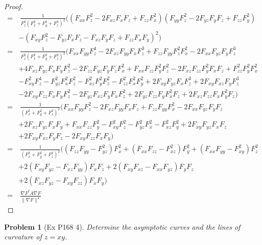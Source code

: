 \documentclass[10pt,a4paper]{article}
\newcounter{theProblemCounter}
\newtheorem{problem}[theProblemCounter]{Problem}
\begin{document}
\begin{proof}
\begin{align*}
=&\ \frac{1}{F_z^2(F_x^2+F_y^2+F_z^2)^2}(\left(F_{xx}F_z^2-2F_{xz}F_xF_z+F_{zz}F_x^2\right)\left(F_{yy}F_z^2-2F_{yz}F_yF_z+F_{zz}F_y^2\right)\\
&-\left(F_{xy}F_z^2-F_{yz}F_xF_z-F_{xz}F_yF_z+F_{zz}F_xF_y\right)^2)\\
=&\ \frac{1}{F_z^2(F_x^2+F_y^2+F_z^2)^2}(
F_{xx}F_{yy}F_z^4-2F_{xz}F_{yy}F_xF_z^3+F_{zz}F_{yy}F_z^2F_x^2-2F_{xx}F_{yz}F_yF_z^3\\
&+4F_{xz}F_{yz}F_xF_yF_z^2-2F_{zz}F_{yz}F_yF_zF_x^2+F_{xx}F_{zz}F_y^2F_z^2-2F_{xz}F_{zz}F_y^2F_xF_z+F_{zz}^2F_y^2F_x^2\\
&-F_{xy}^2F_z^4-F_{yz}^2F_x^2F_z^2-F_{xz}^2F_y^2F_z^2-F_{zz}^2F_x^2F_y^2+2F_{xy}F_{yz}F_xF_z^3+2F_{xy}F_{xz}F_yF_z^3\\
&-2F_{xy}F_{zz}F_xF_yF_z^2-2F_{yz}F_{xz}F_yF_xF_z^2+2F_{yz}F_{zz}F_yF_x^2F_z+2F_{xz}F_{zz}F_xF_y^2F_z)\\
=&\ \frac{1}{(F_x^2+F_y^2+F_z^2)^2}(
F_{xx}F_{yy}F_z^2-2F_{xz}F_{yy}F_xF_z+F_{zz}F_{yy}F_x^2-2F_{xx}F_{yz}F_yF_z\\
&+2F_{xz}F_{yz}F_xF_y+F_{xx}F_{zz}F_y^2-F_{xy}^2F_z^2-F_{yz}^2F_x^2-F_{xz}^2F_y^2+2F_{xy}F_{yz}F_xF_z\\
&+2F_{xy}F_{xz}F_yF_z-2F_{xy}F_{zz}F_xF_y)\\
=&\ \frac{1}{(F_x^2+F_y^2+F_z^2)^2}(
(F_{zz}F_{yy}-F_{yz}^2)F_x^2+(F_{xx}F_{zz}-F_{xz}^2)F_y^2+(F_{xx}F_{yy}-F_{xy}^2)F_z^2\\
&+2(F_{xy}F_{yz}-F_{xz}F_{yy})F_xF_z+2(F_{xy}F_{xz}-F_{xx}F_{yz})F_yF_z\\
&+2(F_{xz}F_{yz}-F_{xy}F_{zz})F_xF_y)\\
=&\ \frac{\nabla F^t A\nabla F}{\|\nabla F\|^4}
\end{align*}
\end{proof}
\setcounter{theProblemCounter}{2}
\begin{problem}[Ex P168 4]
Determine the asymptotic curves and the lines of curvature of $z=xy$.
\end{problem}
\end{document}
